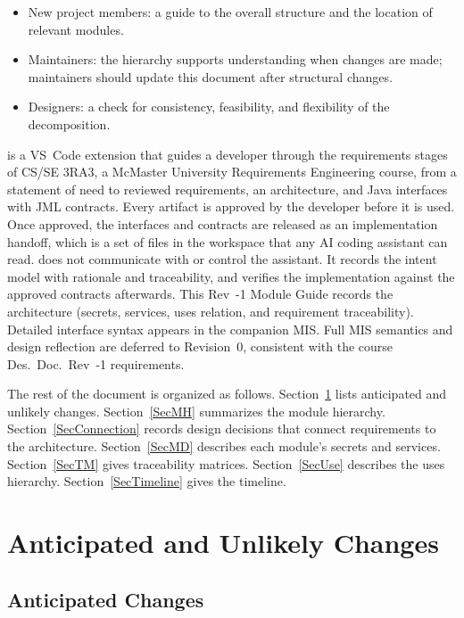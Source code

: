 \documentclass[12pt, titlepage]{article}
\begin{document}
\begin{itemize}
\item New project members: a guide to the overall structure and the location of
  relevant modules.
\item Maintainers: the hierarchy supports understanding when changes are made;
  maintainers should update this document after structural changes.
\item Designers: a check for consistency, feasibility, and flexibility of the
  decomposition.
\end{itemize}

\progname{} is a VS~Code extension that guides a developer through the
requirements stages of CS/SE 3RA3, a McMaster University Requirements Engineering course,
from a statement of need to reviewed requirements, an architecture, and Java interfaces with JML contracts. Every
artifact is approved by the developer before it is used. Once approved, the
interfaces and contracts are released as an implementation handoff, which is a
set of files in the workspace that any AI coding assistant can read.
\progname{} does not communicate with or control the assistant. It records
the intent model with rationale and traceability, and verifies the
implementation against the approved contracts afterwards. This Rev~-1 Module
Guide records the architecture (secrets, services, uses relation, and
requirement traceability). Detailed interface syntax appears in the companion
MIS. Full MIS semantics and design reflection are deferred to Revision~0,
consistent with the course Des.\ Doc.\ Rev~-1 requirements.

The rest of the document is organized as follows. Section~\ref{SecChange} lists
anticipated and unlikely changes. Section~\ref{SecMH} summarizes the module
hierarchy. Section~\ref{SecConnection} records design decisions that connect
requirements to the architecture. Section~\ref{SecMD} describes each module's
secrets and services. Section~\ref{SecTM} gives traceability matrices.
Section~\ref{SecUse} describes the uses hierarchy. Section~\ref{SecTimeline}
gives the timeline.

\section{Anticipated and Unlikely Changes} \label{SecChange}

\subsection{Anticipated Changes} \label{SecAchange}
\end{document}
